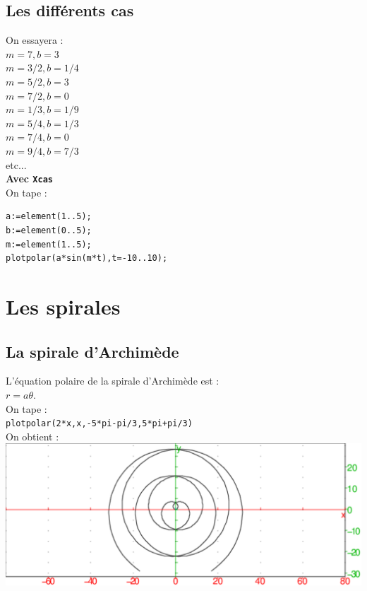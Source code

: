 \documentclass[a4paper,11pt]{book}
\begin{document}
\subsection{Les diff\'erents cas}
On essayera :\\
$m=7,b=3$\\
$m=3/2,b=1/4$\\
$m=5/2,b=3$\\
$m=7/2,b=0$\\
$m=1/3,b=1/9$\\
$m=5/4,b=1/3$\\
$m=7/4,b=0$\\
$m=9/4,b=7/3$\\
etc...\\
{\bf Avec {\tt Xcas}}\\
On tape :\\
\begin{verbatim}
a:=element(1..5);
b:=element(0..5);
m:=element(1..5);
plotpolar(a*sin(m*t),t=-10..10);
\end{verbatim}

\section{Les spirales}
\subsection{La spirale d'Archim\`ede}
L'\'equation polaire de la spirale d'Archim\`ede est :\\
$r=a\theta$.\\
On tape :\\
{\tt plotpolar(2*x,x,-5*pi-pi/3,5*pi+pi/3)}\\
On obtient :\\
\includegraphics[width=\textwidth]{spiral1}
\end{document}
